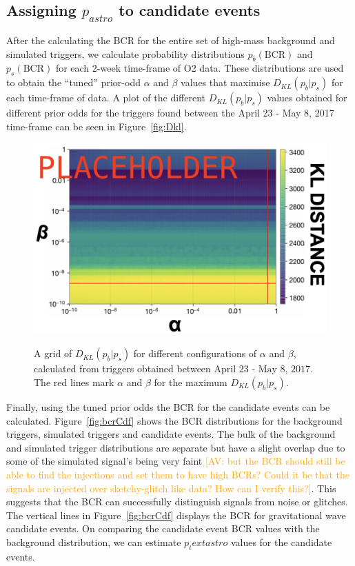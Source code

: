 \documentclass[%
preprint,
 amsmath,amssymb,
 aps,
]{revtex4}
\newcommand{\bcr}{{\sc BCR}\xspace}
\newcommand{\av}[1]{\textcolor{orange}{[AV: #1]}}
\begin{document}
\subsection{Assigning $p_{astro}$ to candidate events}

After the calculating the \bcr for the entire set of high-mass background and simulated triggers, we calculate probability distributions $p_b(\text{BCR})$ and $p_s(\text{BCR})$ for each 2-week time-frame of O2 data. These distributions are used to obtain the ``tuned'' prior-odd $\alpha$ and $\beta$ values that maximise $D_{KL}(p_b|p_s)$ for each time-frame of data. A plot of the different $D_{KL}(p_b|p_s)$ values obtained for different prior odds for the triggers found between the April 23 - May 8, 2017 time-frame can be seen in Figure~\ref{fig:Dkl}. \\

\begin{figure}[!h]
{\centering \includegraphics[width=0.75\linewidth]{images/kl_divergence_grid.png} }
\caption[Grid of KL-Distances for different prior odds]{A grid of $D_{KL}(p_b|p_s)$ for different configurations of $\alpha$ and $\beta$, calculated from triggers obtained between $\text{April 23 - May 8, 2017}$. The red lines mark $\alpha$ and $\beta$ for the maximum $D_{KL}(p_b|p_s)$.}\label{fig:fig:Dkl}
\end{figure}


Finally, using the tuned prior odds the \bcr for the candidate events can be calculated. Figure~\ref{fig:bcrCdf} shows the \bcr distributions for the background triggers, simulated triggers and candidate events. The bulk of the background and simulated trigger distributions are separate but have a slight overlap due to some of the simulated signal's being very faint \av{but the BCR should still be able to find the injections and set them to have high BCRs? Could it be that the signals are injected over sketchy-glitch like data? How can I verify this?}. This suggests that the \bcr can successfully distinguish signals from noise or glitches. The vertical lines in Figure~\ref{fig:bcrCdf} displays the \bcr for gravitational wave candidate events. On comparing the candidate event \bcr values with the background distribution, we can estimate $p_text{astro}$ values for the candidate events. 
\end{document}
